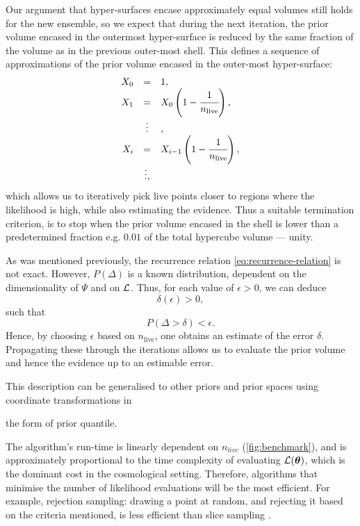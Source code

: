 \documentclass[usenatbib]{mnras}
\begin{document}
Our argument that hyper-surfaces encase approximately equal volumes
still holds for the new ensemble, so we expect that during the next
iteration, the prior volume encased in the outermost hyper-surface
is reduced by the same fraction of the volume as in the previous
outer-most shell. This defines a sequence of approximations of the
prior volume encased in the outer-most hyper-surface:
\begin{equation}
  \begin{array}{rcl}
  X_{0} &=  &1, \\
  X_{1} &= &X_{0} \left(1- \cfrac{1}{n_\text{live}}\right),\\
  & \vdots &, \\
  X_{i} &= &X_{i-1}\left(1- \cfrac{1}{n_\text{live}}\right),\\
  & \vdots, &
\end{array}
\label{eq:recurrence-relation}
\end{equation}
which allows us to iteratively pick live points closer to regions
where the likelihood is high, while also estimating the
evidence. Thus a suitable termination criterion, is to stop when
the prior volume encased in the shell is lower than a predetermined
fraction e.g. \(0.01\) of the total hypercube volume --- unity.

As was mentioned previously, the recurrence relation
\eqref{eq:recurrence-relation} is not exact. However, \(P(\Delta)\) is
a known distribution, dependent on the dimensionality of \(\Psi\) and
on \({\cal L}\). Thus, for each value of \(\epsilon>0\), we can deduce
\[\delta(\epsilon) >0,\] such that \[P(\Delta > \delta)<\epsilon.\]
Hence, by choosing \(\epsilon\) based on \(n_\text{live}\), one obtains
an estimate of the error \(\delta\). Propagating these through the
iterations allows us to evaluate the prior volume and hence the
evidence up to an estimable error.

This description can be generalised to other priors and prior
spaces using coordinate transformations in

the form of prior
quantile.



The algorithm's run-time is linearly dependent on \(n_{live}\)
(\autoref{fig:benchmark}), and is approximately proportional to the
time complexity of evaluating \({\cal L}(\bm{\theta})\), which is the
dominant cost in the cosmological setting. Therefore, algorithms
that minimise the number of likelihood evaluations will be the most
efficient. For example, rejection sampling: drawing a point at
random, and rejecting it based on the criteria mentioned, is less
efficient than slice sampling \citep{Neal_2003}.
\end{document}

